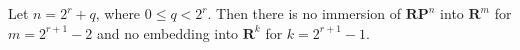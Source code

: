 Let $n = 2^r + q$, where $0 \leq q < 2^r$. Then there is no immersion of $\mathbf{RP}^n$ into $\mathbf{R}^m$ for $m = 2^{r+1} - 2$ and no embedding into $\mathbf{R}^k$ for $k = 2^{r+1} - 1$.
